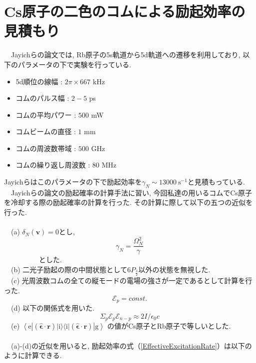 \documentclass[uplatex, dvipdfmx, a4paper, report, papersize, 11pt]{jsbook}
\begin{document}
\section{Cs原子の二色のコムによる励起効率の見積もり}
　Jayichらの論文\cite{PhysRevX.6.041004}では, Rb原子の5s軌道から5d軌道への遷移を利用しており, 以下のパラメータの下で実験を行っている.
\begin{itemize}
  \item 5d順位の線幅 : $2\pi \times 667$ kHz
  \item コムのパルス幅 : $2-5$ ps
  \item コムの平均パワー : $500$ mW
  \item コムビームの直径 : $1$ mm
  \item コムの周波数帯域 : $500$ GHz
  \item コムの繰り返し周波数 : $80$ MHz
\end{itemize}
Jayichらはこのパラメータの下で励起効率を$\gamma_N \sim 13000\ \mathrm{s^{-1}}$と見積もっている. \\
　Jayichらの論文\cite{PhysRevX.6.041004}の励起確率の計算手法に習い, 今回私達の用いるコムでCs原子を冷却する際の励起確率の計算を行った. その計算に際して以下の五つの近似を行った. \\
\\
　(a) $\delta_N(\bm{v}) = 0$とし,
\begin{equation}
  \gamma_N = \frac{\Omega^2_N}{\gamma}
\end{equation}
　　　　　とした. \\
　(b) 二光子励起の際の中間状態として$6P_{\frac{3}{2}}$以外の状態を無視した. \\
　(c) 光周波数コムの全ての縦モードの電場の強さが一定であるとして計算を行った.
\begin{equation}
  \mathcal{E}_p = const.
\end{equation}
　(d) 以下の関係式を用いた.
\begin{equation}
  \Sigma_{p} \mathcal{E}_p\mathcal{E}_{n-p} \approx 2I/\epsilon_0 c
\end{equation}
　(e) $\left\langle \mathrm { e } \left| ( \hat { \boldsymbol { \epsilon } } \cdot \mathbf { r } ) | \mathrm { i } \rangle \langle \mathrm { i } |  ( \hat { \boldsymbol { \epsilon } } \cdot \mathbf { r } ) \right| \mathrm { g } \right\rangle$ の値がCs原子とRb原子で等しいとした. \\
\\
　(a)-(d)の近似を用いると, 励起効率の式（\ref{EffectiveExcitationRate}）は以下のように計算できる. \\
\end{document}

